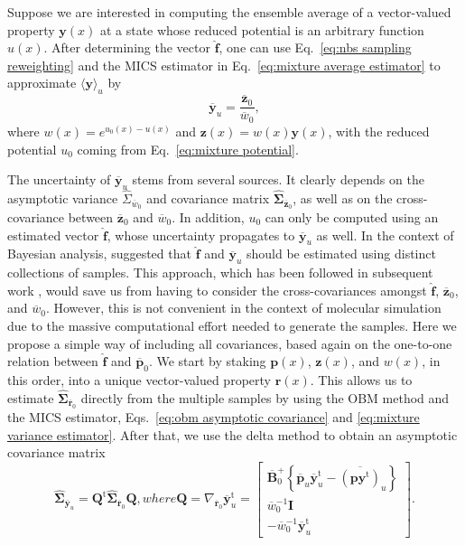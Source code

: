 \documentclass[journal=jctcce,manuscript=article]{achemso}
\newcommand{\mt}[1]{\boldsymbol{\mathbf{#1}}}   %
\newcommand{\vt}[1]{\boldsymbol{\mathbf{#1}}}   %
\newcommand{\tr}[1]{#1^\text{t}}                %
\newcommand{\avg}[1]{\overline{#1}}             %
\begin{document}
Suppose we are interested in computing the ensemble average of a vector-valued property $\vt y(x)$ at a state whose reduced potential is an arbitrary function $u(x)$. After determining the vector $\hat{\vt f}$, one can use Eq.~\eqref{eq:nbs sampling reweighting} and the MICS estimator in Eq.~\eqref{eq:mixture average estimator} to approximate $\langle \vt y \rangle_u$ by
\begin{equation}
\label{eq:mics reweighting}
\avg{\vt y}_u = \frac{\avg{\vt z}_0}{\avg{w}_0},
\end{equation}
where $w(x) = e^{u_0(x) - u(x)}$ and ${\vt z}(x) = w(x) {\vt y}(x)$, with the reduced potential $u_0$ coming from Eq.~\eqref{eq:mixture potential}.

The uncertainty of $\avg{\vt y}_u$ stems from several sources. It clearly depends on the asymptotic variance $\hat \Sigma_{\avg w_0}$ and covariance matrix $\hat{\mt \Sigma}_{\avg{\vt z}_0}$, as well as on the cross-covariance between $\avg{\vt z}_0$ and $\avg w_0$. In addition, $u_0$ can only be computed using an estimated vector $\hat{\vt f}$, whose uncertainty propagates to $\avg{\vt y}_u$ as well. In the context of Bayesian analysis, \citeauthor{Buta_2011} \cite{Buta_2011} suggested that $\hat{\vt f}$ and $\avg{\vt y}_u$ should be estimated using distinct collections of samples. This approach, which has been followed in subsequent work \cite{Tan_2015, Roy_2018}, would save us from having to consider the cross-covariances amongst $\hat{\vt f}$, $\avg{\vt z}_0$, and $\avg w_0$. However, this is not convenient in the context of molecular simulation due to the massive computational effort needed to generate the samples. Here we propose a simple way of including all covariances, based again on the one-to-one relation between $\hat{\vt f}$ and $\avg{\vt p}_0$. We start by staking $\vt p(x)$, $\vt z(x)$, and $w(x)$, in this order, into a unique vector-valued property $\vt r(x)$. This allows us to estimate $\hat{\mt \Sigma}_{\avg{\vt r}_0}$ directly from the multiple samples by using the OBM method and the MICS estimator, Eqs.~\eqref{eq:obm asymptotic covariance} and \eqref{eq:mixture variance estimator}. After that, we use the delta method to obtain an asymptotic covariance matrix
\begin{subequations}
\label{eq:mics reweighting uncertainty}
\begin{equation}
\label{eq:mics reweighting delta method}
\hat{\mt \Sigma}_{\avg{\vt y}_u} = \tr{\mt Q} \hat{\mt \Sigma}_{\avg{\vt r}_0} {\mt Q},
\end{equation}
where
\begin{equation}
\label{eq:mics reweighting gradient}
{\mt Q} = \nabla_{\avg{\vt r}_0} \tr{\avg{\vt y}}_u = \left[\begin{array}{c}
\avg{\mt B}_0^+ \left\{ \avg{\vt p}_u \tr{\avg{\vt y}}_u - \avg{(\vt p \tr{\vt y})}_u\right\} \\
\avg{w}_0^{-1} {\mt I} \\
-\avg{w}_0^{-1} \tr{\avg{\vt y}}_u
\end{array}\right].
\end{equation}
\end{subequations}
\end{document}
